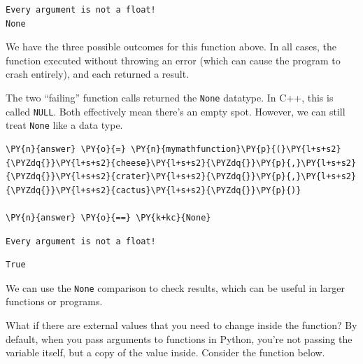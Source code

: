     \begin{Verbatim}[commandchars=\\\{\}]
Every argument is not a float!
None
    \end{Verbatim}

    We have the three possible outcomes for this function above. In all
cases, the function executed without throwing an error (which can cause
the program to crash entirely), and each returned a result.

The two ``failing'' function calls returned the \texttt{None} datatype.
In C++, this is called \texttt{NULL}. Both effectively mean there's an
empty spot. However, we can still treat \texttt{None} like a data type.

    \begin{tcolorbox}[breakable, size=fbox, boxrule=1pt, pad at break*=1mm,colback=cellbackground, colframe=cellborder]
\begin{Verbatim}[commandchars=\\\{\}]
\PY{n}{answer} \PY{o}{=} \PY{n}{mymathfunction}\PY{p}{(}\PY{l+s+s2}{\PYZdq{}}\PY{l+s+s2}{cheese}\PY{l+s+s2}{\PYZdq{}}\PY{p}{,}\PY{l+s+s2}{\PYZdq{}}\PY{l+s+s2}{crater}\PY{l+s+s2}{\PYZdq{}}\PY{p}{,}\PY{l+s+s2}{\PYZdq{}}\PY{l+s+s2}{cactus}\PY{l+s+s2}{\PYZdq{}}\PY{p}{)}

\PY{n}{answer} \PY{o}{==} \PY{k+kc}{None}
\end{Verbatim}
\end{tcolorbox}

    \begin{Verbatim}[commandchars=\\\{\}]
Every argument is not a float!
    \end{Verbatim}

            \begin{tcolorbox}[breakable, size=fbox, boxrule=.5pt, pad at break*=1mm, opacityfill=0]
\begin{Verbatim}[commandchars=\\\{\}]
True
\end{Verbatim}
\end{tcolorbox}
        
    We can use the \texttt{None} comparison to check results, which can be
useful in larger functions or programs.

What if there are external values that you need to change inside the
function? By default, when you pass arguments to functions in Python,
you're not passing the variable itself, but a copy of the value inside.
Consider the function below.

